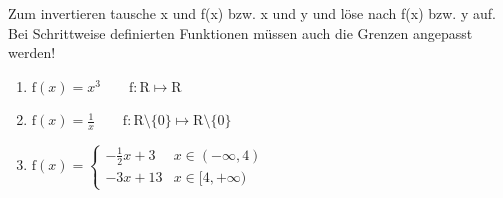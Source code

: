 \documentclass[11pt, a4paper]{article}
\newif\ifshowsolution
\begin{document}
Zum invertieren tausche x und f(x) bzw. x und y und löse nach f(x) bzw. y auf. Bei Schrittweise definierten Funktionen müssen auch die Grenzen angepasst werden!
\begin{enumerate}
	\item $\mathrm{f}(x) = x^3 \qquad \mathrm{f}: \mathrm{R} \mapsto \mathrm{R}$
	
	\ifshowsolution
		$x = {\mathrm{f}(x)}^3$ \\
		$\sqrt[3]{x} = f(x)$
	\fi
	
	\item $\mathrm{f}(x) = \frac{1}{x} \qquad \mathrm{f}: \mathrm{R} \setminus \{0\} \mapsto \mathrm{R} \setminus \{0\}$
	
	\ifshowsolution
		$x = \frac{1}{\mathrm{f}(x)}$ (Vertauschen von f(x) und x)\\
		$\mathrm{f}(x) = \frac{1}{x}$ (Aufgelöst nach f(x))
	\fi
	
	\item $\mathrm{f}(x) =
		\begin{cases}
			-\frac{1}{2}x + 3 & x \in (-\infty, 4) \\
			-3x + 13 & x \in [4, +\infty)
		\end{cases}
		$
		
	\ifshowsolution
		\begin{enumerate}
			\item $\mathrm{f}(x) = -\frac{1}{2}x + 3$ invertieren \\
				\begin{align*}
					x &= -\frac{1}{2}\mathrm{f}(x) + 3 \\
					x-3 &= -\frac{1}{2}\mathrm{f}(x) \\
					-2x+6 &= \mathrm{f}(x)
				\end{align*}
			\item $\mathrm{f}(x) = -3x + 13$ invertieren
			\begin{align*}
				x = -3 \mathrm{f}(x) + 13 \\
				x - 13 = -3 \mathrm{f}(x) \\
				\frac{-x + 13}{3} = \mathrm{f}(x)
			\end{align*}
			\item Grenzen neu berechnen \\
			y-Wert des Schnittpunktes in Umkehrfunktion der Funktion einsetzen, die den Schnittpunkt enthält: \\
			$\mathrm{f}(1) = \frac{-1 + 13}{3} = 4$ \\
			Der neue Schnittpunkt hat also die Koordinaten (1,4)
		\end{enumerate}
		Die Umkehrfunktion ist somit:
		$\begin{cases}
			-2x+6, & x \in (-\infty,1) \\
			\frac{-x + 13}{3} & x \in [1, +\infty)
		\end{cases}$
	\fi
\end{enumerate}
\end{document}
